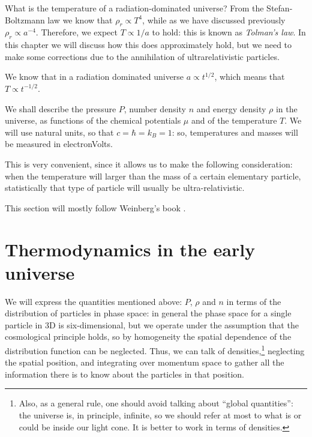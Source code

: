 \documentclass[main.tex]{subfiles}
\begin{document}

What is the temperature of a radiation-dominated universe?
From the Stefan-Boltzmann law we know that \(\rho _r \propto T^{4}\), while as we have discussed previously \(\rho _r \propto a^{-4}\).
Therefore, we expect \(T \propto 1/a\) to hold: this is known as \emph{Tolman's law}.
In this chapter we will discuss how this does approximately hold, but we need to make some corrections due to the annihilation of ultrarelativistic particles.

We know that in a radiation dominated universe \(a \propto t^{1/2}\), which means that \(T \propto t^{-1/2}\).

We shall describe the pressure \(P\), number density \(n\) and energy density \(\rho  \) in the universe, as functions of the chemical potentials \(\mu \) and of  the temperature \(T\).
We will use natural units, so that \(c= \hbar = k_B = 1\): so, temperatures and masses will be measured in electronVolts. 

This is very convenient, since it allows us to make the following consideration: when the temperature will larger than the mass of a certain elementary particle, statistically that type of particle will usually be ultra-relativistic.

This section will mostly follow Weinberg's book \cite[page 538, section 15.6]{weinbergGravitationCosmologyPrinciples1972}.

\section{Thermodynamics in the early universe}

We will express the quantities mentioned above: \(P\), \(\rho \) and \(n\) in terms of the distribution of particles in phase space: in general the phase space for a single particle in 3D is six-dimensional, but we operate under the assumption that the cosmological principle holds, so by homogeneity the spatial dependence of the distribution function can be neglected. 
Thus, we can talk of densities,\footnote{Also, as a general rule, one should avoid talking about ``global quantities'': the universe is, in principle, infinite, so we should refer at most to what is or could be inside our light cone. It is better to work in terms of densities.} neglecting the spatial position, and integrating over momentum space to gather all the information there is to know about the particles in that position.
\end{document}
